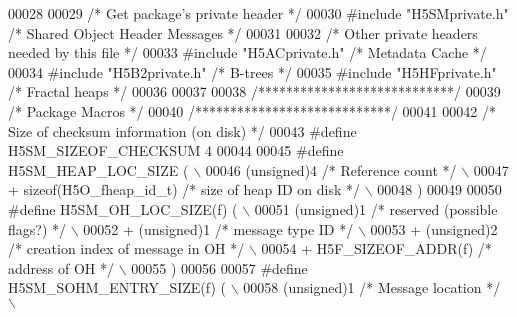 \begin{DoxyCode}
00028 
00029 \textcolor{comment}{/* Get package's private header */}
00030 \textcolor{preprocessor}{#include "H5SMprivate.h"}    \textcolor{comment}{/* Shared Object Header Messages    */}
00031 
00032 \textcolor{comment}{/* Other private headers needed by this file */}
00033 \textcolor{preprocessor}{#include "H5ACprivate.h"}        \textcolor{comment}{/* Metadata Cache           */}
00034 \textcolor{preprocessor}{#include "H5B2private.h"}        \textcolor{comment}{/* B-trees                              */}
00035 \textcolor{preprocessor}{#include "H5HFprivate.h"}        \textcolor{comment}{/* Fractal heaps            */}
00036 
00037 
00038 \textcolor{comment}{/****************************/}
00039 \textcolor{comment}{/* Package Macros           */}
00040 \textcolor{comment}{/****************************/}
00041 
00042 \textcolor{comment}{/* Size of checksum information (on disk) */}
00043 \textcolor{preprocessor}{#define H5SM\_SIZEOF\_CHECKSUM 4}
00044 
00045 \textcolor{preprocessor}{#define H5SM\_HEAP\_LOC\_SIZE (                                                  \(\backslash\)}
00046 \textcolor{preprocessor}{        (unsigned)4                     }\textcolor{comment}{/* Reference count */}\textcolor{preprocessor}{                 \(\backslash\)}
00047 \textcolor{preprocessor}{        + sizeof(H5O\_fheap\_id\_t)        }\textcolor{comment}{/* size of heap ID on disk */}\textcolor{preprocessor}{         \(\backslash\)}
00048 \textcolor{preprocessor}{    )}
00049 
00050 \textcolor{preprocessor}{#define H5SM\_OH\_LOC\_SIZE(f) (                                                 \(\backslash\)}
00051 \textcolor{preprocessor}{        (unsigned)1             }\textcolor{comment}{/* reserved (possible flags?) */}\textcolor{preprocessor}{              \(\backslash\)}
00052 \textcolor{preprocessor}{        + (unsigned)1           }\textcolor{comment}{/* message type ID */}\textcolor{preprocessor}{                 \(\backslash\)}
00053 \textcolor{preprocessor}{        + (unsigned)2           }\textcolor{comment}{/* creation index of message in OH */}\textcolor{preprocessor}{         \(\backslash\)}
00054 \textcolor{preprocessor}{        + H5F\_SIZEOF\_ADDR(f)    }\textcolor{comment}{/* address of OH */}\textcolor{preprocessor}{                           \(\backslash\)}
00055 \textcolor{preprocessor}{    )}
00056 
00057 \textcolor{preprocessor}{#define H5SM\_SOHM\_ENTRY\_SIZE(f) (                                             \(\backslash\)}
00058 \textcolor{preprocessor}{        (unsigned)1             }\textcolor{comment}{/* Message location */}\textcolor{preprocessor}{                        \(\backslash\)}

\end{DoxyCode}
